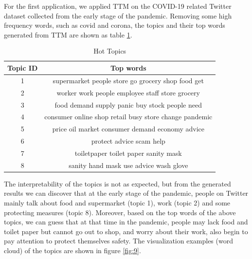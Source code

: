 For the first application, we applied TTM on the COVID-19 related Twitter dataset collected from the early stage of the pandemic. Removing some high frequency words, such as covid and corona, the topics and their top words generated from TTM are shown as table \ref{table_5}.

\begin{table}[htbp]
\centering
\begin{tabular}{|c|c|}
\hline
Topic ID & Top words\\
\hline
1 & supermarket people store go grocery shop food get\\
\hline
2 & worker work people employee staff store grocery\\
\hline
3 & food demand supply panic buy stock people need\\
\hline
4 & consumer online shop retail busy store change pandemic \\
\hline
5 & price oil market consumer demand economy advice\\
\hline
6 & protect advice scam help\\
\hline
7 & toiletpaper toilet paper sanity mask\\
\hline
8 & sanity hand mask use advice wash glove\\
\hline
\end{tabular}
\caption{Hot Topics}
\label{table_5}
\end{table}

The interpretability of the topics is not as expected, but from the generated results we can discover that at the early stage of the pandemic, people on Twitter mainly talk about food and supermarket (topic 1), work (topic 2) and some protecting measures (topic 8). Moreover, based on the top words of the above topics, we can guess that at that time in the pandemic, people may lack food and toilet paper but cannot go out to shop, and worry about their work, also begin to pay attention to protect themselves safety. The visualization examples (word cloud) of the topics are shown in figure \ref{fig:9}.

